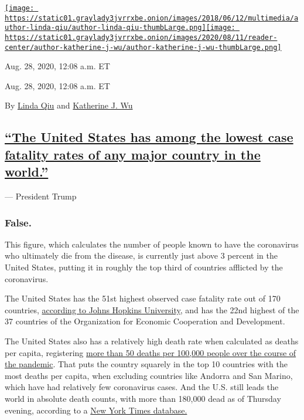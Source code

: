 \href{https://www.nytimes3xbfgragh.onion/by/linda-qiu}{\texttt{[image: https://static01.graylady3jvrrxbe.onion/images/2018/06/12/multimedia/author-linda-qiu/author-linda-qiu-thumbLarge.png]}}\href{https://www.nytimes3xbfgragh.onion/by/katherine-j--wu}{\texttt{[image: https://static01.graylady3jvrrxbe.onion/images/2020/08/11/reader-center/author-katherine-j-wu/author-katherine-j-wu-thumbLarge.png]}}

Aug. 28, 2020, 12:08 a.m. ET

Aug. 28, 2020, 12:08 a.m. ET

By \href{https://www.nytimes3xbfgragh.onion/by/linda-qiu}{Linda Qiu} and
\href{https://www.nytimes3xbfgragh.onion/by/katherine-j--wu}{Katherine
J. Wu}

\hypertarget{the-united-states-has-among-the-lowest-case-fatality-rates-of-any-major-country-in-the-world}{%
\subsection{\texorpdfstring{\protect\hyperlink{the-united-states-has-among-the-lowest-case-fatality-rates-of-any-major-country-in-the-world}{``The
United States has among the lowest case fatality rates of any major
country in the
world.''}}{``The United States has among the lowest case fatality rates of any major country in the world.''}}\label{the-united-states-has-among-the-lowest-case-fatality-rates-of-any-major-country-in-the-world}}

--- President Trump

\hypertarget{false-}{%
\subsubsection{\texorpdfstring{\textbf{False.}
}{False. }}\label{false-}}

This figure, which calculates the number of people known to have the
coronavirus who ultimately die from the disease, is currently just above
3 percent in the United States, putting it in roughly the top third of
countries afflicted by the coronavirus.

The United States has the 51st highest observed case fatality rate out
of 170 countries,
\href{https://coronavirus.jhu.edu/data/mortality}{according to Johns
Hopkins University}, and has the 22nd highest of the 37 countries of the
Organization for Economic Cooperation and Development.

The United States also has a relatively high death rate when calculated
as deaths per capita, registering
\href{https://coronavirus.jhu.edu/data/mortality}{more than 50 deaths
per 100,000 people over the course of the pandemic}. That puts the
country squarely in the top 10 countries with the most deaths per
capita, when excluding countries like Andorra and San Marino, which have
had relatively few coronavirus cases. And the U.S. still leads the world
in absolute death counts, with more than 180,000 dead as of Thursday
evening, according to a
\href{https://www.nytimes3xbfgragh.onion/interactive/2020/world/coronavirus-maps.html}{New
York Times database.}

